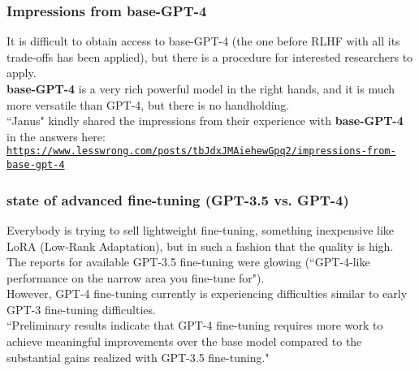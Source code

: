 \documentclass{beamer}
\newcommand{\msblue}[1]{{\color{myblue} #1}}
\begin{document}
\begin{frame}

  \frametitle{Impressions from base-GPT-4}

It is difficult to obtain access to base-GPT-4 (the one before RLHF with all its
trade-offs has been applied), but there is a procedure for interested researchers to apply.\\[2ex]

{\bf base-GPT-4} is a very rich powerful model in the right hands, and it is much more
versatile than GPT-4, but there is no handholding.\\[2ex]

``Janus" kindly shared the impressions from their experience with {\bf base-GPT-4}
in the answers here:\\[2ex]

\msblue{\href{https://www.lesswrong.com/posts/tbJdxJMAiehewGpq2/impressions-from-base-gpt-4}{\tt\scriptsize https://www.lesswrong.com/posts/tbJdxJMAiehewGpq2/impressions-from-base-gpt-4}}

\end{frame}

\begin{frame}

  \frametitle{state of advanced fine-tuning (GPT-3.5 vs. GPT-4)}

Everybody is trying to sell lightweight fine-tuning, something inexpensive like LoRA (Low-Rank Adaptation), 
but in such a fashion that the quality is high.\\[2ex]

The reports for available GPT-3.5 fine-tuning were glowing (``GPT-4-like performance on the
narrow area you fine-tune for").\\[2ex]

However, GPT-4 fine-tuning currently is experiencing difficulties similar to early GPT-3 fine-tuning difficulties.\\[2ex]

{\footnotesize ``Preliminary results indicate that GPT-4 fine-tuning requires more work to achieve meaningful improvements over the base model compared to the substantial gains realized with GPT-3.5 fine-tuning."}

\end{frame}
\end{document}
